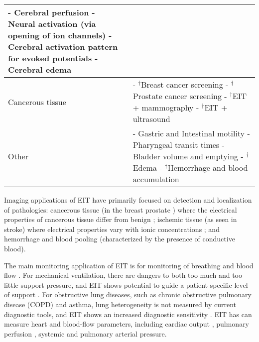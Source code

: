 \documentclass[10pt,journal]{IEEEtran}\def\TBLWIDA{15mm}\def\TBLWIDB{60mm}
\begin{document}
\begin{table}
\begin{tabular}{p{\TBLWIDA}p{\TBLWIDB}}
 - Cerebral perfusion \cite{Adler2017Cerebral}
          \newline
 - Neural activation (via opening of ion channels) \cite{Aristovich2014Neural}
          \newline
 - Cerebral activation pattern for evoked potentials
          \newline
 - Cerebral edema \cite{Holder1992Ischaemia}
\\
    \hline
Cancerous tissue &
 - $^\dagger$Breast cancer screening \cite{Assenheimer2001TScan,Cherepenin2001Breast} 
      \newline
 - $^\dagger$Prostate cancer screening \cite{Borsic2009Prostate, Halter2007Postate}
      \newline
 - $^\dagger$EIT + mammography \cite{Choi2007Mammography}
      \newline
 - $^\dagger$EIT + ultrasound \cite{Soleimani2006Ultrasound}
\\
    \hline
Other &
 - Gastric and Intestinal motility \cite{Mangnall1987}
       \newline
 - Pharyngeal transit times \cite{Mangnall1987}
       \newline
 - Bladder volume and emptying \cite{Leonhardt2011Bladder}
       \newline
 - $^\dagger$Edema \cite{Abboud1995Peripheral, Newell1996}
       \newline
 - $^\dagger$Hemorrhage and blood accumulation \cite{Sadleir2009blood}
\end{tabular}
\end{table}

Imaging applications of EIT have primarily focused on detection
and localization of pathologies: cancerous tissue (in the breast
\cite{Assenheimer2001TScan,Cherepenin2001Breast} prostate
\cite{Borsic2009Prostate}) where the electrical properties of cancerous tissue
differ from benign \cite{Jossinet1998Breast}; ischemic tissue (as seen in
stroke) where electrical properties vary with ionic concentrations
\cite{Holder1992Ischaemia}; and hemorrhage and blood pooling (characterized by
the presence of conductive blood).

The main monitoring application of EIT is for monitoring of breathing
and blood flow
 \cite{Frerichs2017Chest}. For mechanical ventilation,
there are dangers to both too much and too little
support pressure, and EIT shows potential to guide a
patient-specific level of support \cite{Wolf2013Mechanical}.
For obstructive lung diseases, such as chronic obstructive pulmonary disease
(COPD) and asthma, lung heterogeneity 
is not measured by current diagnostic
tools, and EIT shows an increased diagnostic sensitivity
\cite{Vogt2016Heterogeneity}.
EIT has can measure 
heart and blood-flow parameters, including 
cardiac output \cite{vonkNoordegraaf2000},
pulmonary perfusion \cite{Frerichs2002Perfusion},
systemic \cite{Sola2011Central} and pulmonary
arterial \cite{Proenca2016Noninvasive} pressure.
\end{document}
